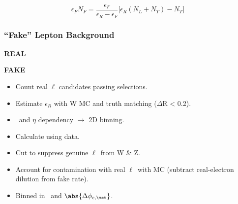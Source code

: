 \begin{frame}
\vspace{10pt}
		\begin{equation*}
			\epsilon_{F}N_{F} = \frac{\epsilon_{F}}{\epsilon_{R} - \epsilon_{F}} \big[ \epsilon_{R}(N_{L} + N_{T}) - N_{T} \big]	
		\end{equation*}
		
		\vspace{-10pt}
\end{frame}
	

\begin{frame}
	\frametitle{``Fake'' Lepton Background}
	\vspace{10pt}

	\vspace{20pt}
		\begin{minipage}{0.44\textwidth}
			\begin{center}
				{\bfseries REAL}
			\end{center}
		\end{minipage}
		\begin{minipage}{0.52\textwidth}
			\begin{center}
				{\bfseries FAKE}
			\end{center}
		\end{minipage}\par\medskip
		\begin{minipage}{0.44\textwidth}
			\begin{itemize}
				\item Count real $\ell$ candidates passing selections.
				\item Estimate $\epsilon_{R}$ with W MC and truth matching ($\Delta$R < 0.2).
				\item \pt\, and $\eta$ dependency $\rightarrow$ 2D binning.
			\end{itemize}
		\end{minipage}
		\begin{minipage}{0.52\textwidth}
			\begin{itemize}
				\item Calculate using data.
				\item Cut to suppress genuine $\ell$\, from W \& Z.
				\item Account for contamination with real $\ell$\, with MC {\footnotesize (subtract real-electron dilution from fake rate)}.
				\item Binned in \pt\, and $\abs{\Delta\phi_{e,\met} }$.
			\end{itemize}
		\end{minipage}
	
\end{frame}		


